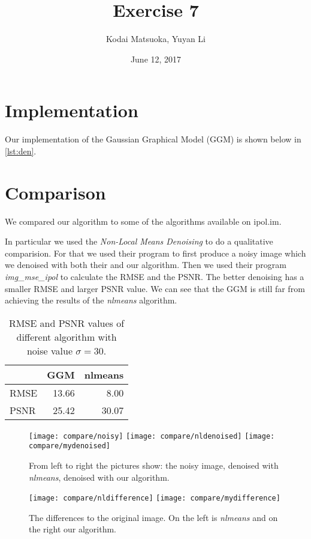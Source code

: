 \documentclass[12pt]{scrartcl}
\author{Kodai Matsuoka, Yuyan Li}
\title{Exercise 7}
\date{June 12, 2017}
\begin{document}
\maketitle

\section{Implementation}

Our implementation of the Gaussian Graphical Model (GGM) is shown below in \cref{lst:den}.


\section{Comparison}

We compared our algorithm to some of the algorithms available on ipol.im.

In particular we used the \emph{Non-Local Means Denoising} to do a qualitative comparision. For that we used their program to first produce a noisy image which we denoised with both their and our algorithm. Then we used their program \emph{img\_mse\_ipol} to calculate the RMSE and the PSNR. The better denoising has a smaller RMSE and larger PSNR value. We can see that the GGM is still far from achieving the results of the \emph{nlmeans} algorithm.

\begin{table}
  \centering
  \caption{RMSE and PSNR values of different algorithm with noise value $\sigma=30$.}
  \begin{tabular}{l | r | r}
          & GGM   & nlmeans \\
    \hline
    RMSE  & 13.66 & 8.00    \\
    PSNR  & 25.42 & 30.07
  \end{tabular}
  \label{tab:rmse}
\end{table}

\begin{figure}
  \centering
  \texttt{[image: compare/noisy]}
  \texttt{[image: compare/nldenoised]}
  \texttt{[image: compare/mydenoised]}
  \label{fig:den}
  \caption{From left to right the pictures show: the noisy image, denoised with \emph{nlmeans}, denoised with our algorithm.}
\end{figure}

\begin{figure}
  \centering
  \texttt{[image: compare/nldifference]}
  \texttt{[image: compare/mydifference]}
  \label{fig:diff}
  \caption{The differences to the original image. On the left is \emph{nlmeans} and on the right our algorithm.}
\end{figure}




\clearpage

\end{document}
